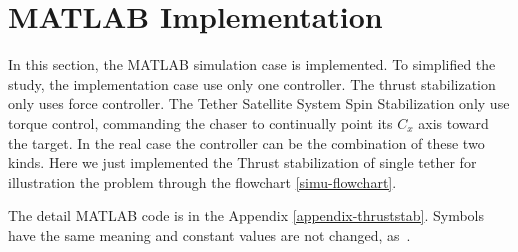 \section{MATLAB Implementation}
In this section, the MATLAB simulation case is implemented. To simplified the study, the implementation case use only one controller. The thrust stabilization only uses force controller. The Tether Satellite System Spin Stabilization only use torque control, commanding the chaser to continually point its $C_x$  axis toward the target. In the real case the controller can be the combination of these two kinds. Here we just implemented the Thrust stabilization of single tether for illustration the problem through the flowchart \ref{simu-flowchart}.

The detail MATLAB code is in the Appendix \ref{appendix-thruststab}. Symbols have the same meaning and constant values are not changed, as~\cite{hovell2017experimental}. 

